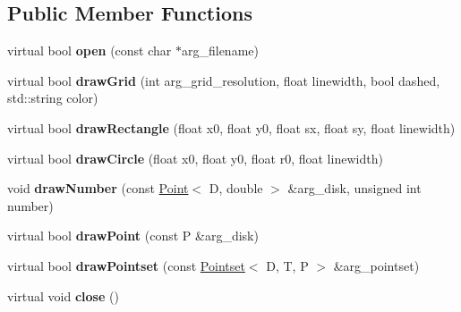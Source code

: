 \subsection*{Public Member Functions}
\begin{DoxyCompactItemize}
\item 
\hypertarget{classutk_1_1PointsetIllustrator__TIKZ_a063c8ed03ef2162f2f01f25c3b29d8c5}{virtual bool {\bfseries open} (const char $\ast$arg\-\_\-filename)}\label{classutk_1_1PointsetIllustrator__TIKZ_a063c8ed03ef2162f2f01f25c3b29d8c5}

\item 
\hypertarget{classutk_1_1PointsetIllustrator__TIKZ_a79b63d429cf3009b3dbc341624b414be}{virtual bool {\bfseries draw\-Grid} (int arg\-\_\-grid\-\_\-resolution, float linewidth, bool dashed, std\-::string color)}\label{classutk_1_1PointsetIllustrator__TIKZ_a79b63d429cf3009b3dbc341624b414be}

\item 
\hypertarget{classutk_1_1PointsetIllustrator__TIKZ_a5c34983888dd03c664b861dac9883ff0}{virtual bool {\bfseries draw\-Rectangle} (float x0, float y0, float sx, float sy, float linewidth)}\label{classutk_1_1PointsetIllustrator__TIKZ_a5c34983888dd03c664b861dac9883ff0}

\item 
\hypertarget{classutk_1_1PointsetIllustrator__TIKZ_a388cbc5920d41ab459c77ffadd0c8798}{virtual bool {\bfseries draw\-Circle} (float x0, float y0, float r0, float linewidth)}\label{classutk_1_1PointsetIllustrator__TIKZ_a388cbc5920d41ab459c77ffadd0c8798}

\item 
\hypertarget{classutk_1_1PointsetIllustrator__TIKZ_af4e1fd6e1fa781d723588ad05b505339}{void {\bfseries draw\-Number} (const \hyperlink{classutk_1_1Point}{Point}$<$ D, double $>$ \&arg\-\_\-disk, unsigned int number)}\label{classutk_1_1PointsetIllustrator__TIKZ_af4e1fd6e1fa781d723588ad05b505339}

\item 
\hypertarget{classutk_1_1PointsetIllustrator__TIKZ_a34d7f0f8ef3400d15634d47d917f1dd0}{virtual bool {\bfseries draw\-Point} (const P \&arg\-\_\-disk)}\label{classutk_1_1PointsetIllustrator__TIKZ_a34d7f0f8ef3400d15634d47d917f1dd0}

\item 
\hypertarget{classutk_1_1PointsetIllustrator__TIKZ_ac663396fbae716fd6979867962bd5268}{virtual bool {\bfseries draw\-Pointset} (const \hyperlink{classutk_1_1Pointset}{Pointset}$<$ D, T, P $>$ \&arg\-\_\-pointset)}\label{classutk_1_1PointsetIllustrator__TIKZ_ac663396fbae716fd6979867962bd5268}

\item 
\hypertarget{classutk_1_1PointsetIllustrator__TIKZ_a8933d4e5fc06d78e9c84afbc76830a00}{virtual void {\bfseries close} ()}\label{classutk_1_1PointsetIllustrator__TIKZ_a8933d4e5fc06d78e9c84afbc76830a00}

\end{DoxyCompactItemize}

